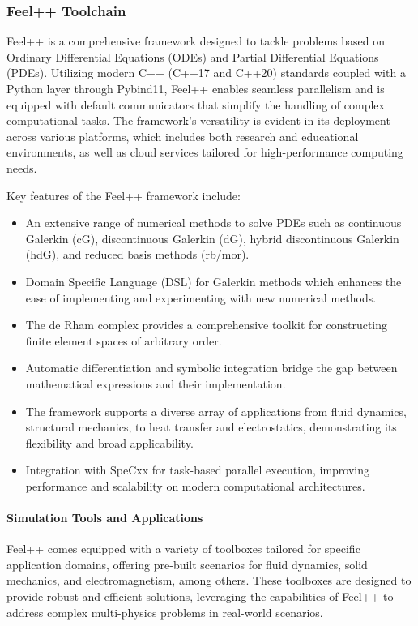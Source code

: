 \documentclass[runningheads]{llncs}
\begin{document}
\subsubsection{Feel++ Toolchain}

Feel++ is a comprehensive framework designed to tackle problems based on Ordinary Differential Equations (ODEs) and Partial Differential Equations (PDEs). Utilizing modern C++ (C++17 and C++20) standards coupled with a Python layer through Pybind11, Feel++ enables seamless parallelism and is equipped with default communicators that simplify the handling of complex computational tasks. The framework's versatility is evident in its deployment across various platforms, which includes both research and educational environments, as well as cloud services tailored for high-performance computing needs.

Key features of the Feel++ framework include:
\begin{itemize}
    \item An extensive range of numerical methods to solve PDEs such as continuous Galerkin (cG), discontinuous Galerkin (dG), hybrid discontinuous Galerkin (hdG), and reduced basis methods (rb/mor).
    \item Domain Specific Language (DSL) for Galerkin methods which enhances the ease of implementing and experimenting with new numerical methods.
    \item The de Rham complex provides a comprehensive toolkit for constructing finite element spaces of arbitrary order.
    \item Automatic differentiation and symbolic integration bridge the gap between mathematical expressions and their implementation.
    \item The framework supports a diverse array of applications from fluid dynamics, structural mechanics, to heat transfer and electrostatics, demonstrating its flexibility and broad applicability.
    \item Integration with SpeCxx for task-based parallel execution, improving performance and scalability on modern computational architectures.
\end{itemize}

\paragraph{Simulation Tools and Applications}
Feel++ comes equipped with a variety of toolboxes tailored for specific application domains, offering pre-built scenarios for fluid dynamics, solid mechanics, and electromagnetism, among others. These toolboxes are designed to provide robust and efficient solutions, leveraging the capabilities of Feel++ to address complex multi-physics problems in real-world scenarios.
\end{document}
